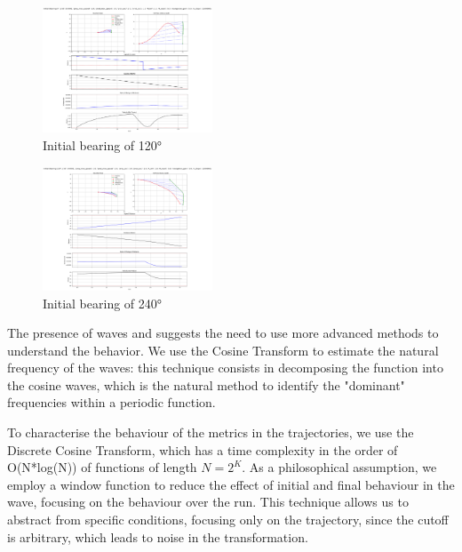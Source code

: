 \documentclass[10pt, twocolumn]{article}
\begin{document}
        \begin{figure}[H]
          \centering
          \includegraphics[width=0.45\textwidth]{figures/initial_bearing_120.png}
          \caption{Initial bearing of 120°}
          \label{fig:bear120}
        \end{figure}

        \begin{figure}[H]
          \centering
          \includegraphics[width=0.45\textwidth]{figures/initial_bearing_240.png}
          \caption{Initial bearing of 240°}
          \label{fig:bear240}
        \end{figure}

        The presence of waves and suggests the need to use more advanced methods to understand the behavior. We use the Cosine Transform to estimate the natural frequency of the waves: this technique consists in decomposing the function into the cosine waves, which is the natural method to identify the "dominant" frequencies within a periodic function.

        To characterise the behaviour of the metrics in the trajectories, we use the Discrete Cosine Transform, which has a time complexity in the order of O(N*log(N)) of functions of length $N = 2^K$. As a philosophical assumption, we employ a window function to reduce the effect of initial and final behaviour in the wave, focusing on the behaviour over the run. This technique allows us to abstract from specific conditions, focusing only on the trajectory, since the cutoff is arbitrary, which leads to noise in the transformation.
\end{document}
